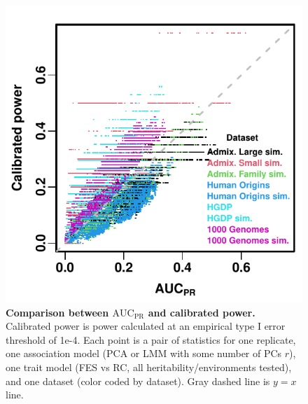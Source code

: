 \documentclass[11pt]{article}
\newcommand{\auc}{\text{AUC}_\text{PR}}
\begin{document}
\begin{figure}[hp!]
  \centering
  \includegraphics{auc-vs-power.pdf}
  \caption{
    {\bf Comparison between $\auc$ and calibrated power.}
    Calibrated power is power calculated at an empirical type I error threshold of 1e-4.
    Each point is a pair of statistics for one replicate, one association model (PCA or LMM with some number of PCs $r$), one trait model (FES vs RC, all heritability/environments tested), and one dataset (color coded by dataset).
    Gray dashed line is $y = x$ line.
  }
  \label{fig:auc-vs-power}
\end{figure}
\end{document}
